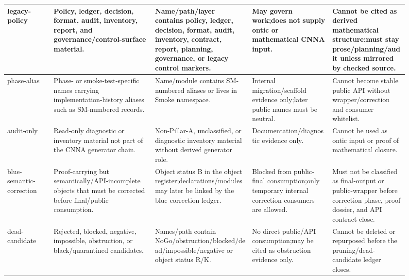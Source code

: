 \begin{longtable}{L{0.115\linewidth} L{0.245\linewidth} L{0.23\linewidth} L{0.19\linewidth} L{0.18\linewidth}}
\hline
\addlinespace[0.24em]
legacy-policy & Policy, ledger, decision, format, audit, inventory, report, and governance/\allowbreak{}control-surface material. & Name/\allowbreak{}path/\allowbreak{}layer contains policy, ledger, decision, format, audit, inventory, contract, report, planning, governance, or legacy control markers. & May govern work;\newline does not supply ontic or mathematical CNNA input. & Cannot be cited as derived mathematical structure;\newline must stay prose/\allowbreak{}planning/\allowbreak{}audit unless mirrored by checked source.\\
\hline
\addlinespace[0.24em]
phase-alias & Phase- or smoke-test-specific names carrying implementation-history aliases such as SM-numbered records. & Name/\allowbreak{}module contains SM-numbered aliases or lives in Smoke namespace. & Internal migration/\allowbreak{}scaffold evidence only;\newline later public names must be neutral. & Cannot become stable public API without wrapper/\allowbreak{}correction and consumer whitelist.\\
\hline
\addlinespace[0.24em]
audit-only & Read-only diagnostic or inventory material not part of the CNNA generator chain. & Non-Pillar-A, unclassified, or diagnostic inventory material without derived generator role. & Documentation/\allowbreak{}diagnostic evidence only. & Cannot be used as ontic input or proof of mathematical closure.\\
\hline
\addlinespace[0.24em]
blue-semantic-correction & Proof-carrying but semantically/\allowbreak{}API-incomplete objects that must be corrected before final/\allowbreak{}public consumption. & Object status B in the object register;\newline declarations/\allowbreak{}modules may later be linked by the blue-correction ledger. & Blocked from public-final consumption;\newline only temporary internal correction consumers are allowed. & Must not be classified as final-output or public-wrapper before correction phase, proof dossier, and API contract close.\\
\hline
\addlinespace[0.24em]
dead-candidate & Rejected, blocked, negative, impossible, obstruction, or black/\allowbreak{}quarantined candidates. & Names/\allowbreak{}path contain NoGo/\allowbreak{}obstruction/\allowbreak{}blocked/\allowbreak{}dead/\allowbreak{}impossible/\allowbreak{}negative or object status R/\allowbreak{}K. & No direct public/\allowbreak{}API consumption;\newline may be cited as obstruction evidence only. & Cannot be deleted or repurposed before the pruning/\allowbreak{}dead-candidate ledger closes.\\

\end{longtable}
